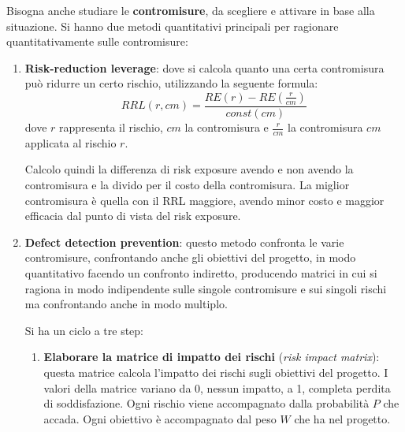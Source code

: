 Bisogna anche studiare le \textbf{contromisure}, da scegliere e attivare in base
alla situazione. Si hanno due metodi quantitativi principali per ragionare
quantitativamente sulle contromisure:
\begin{enumerate}
    \item \textbf{Risk-reduction leverage}: dove si calcola quanto una certa
          contromisura può ridurre un certo rischio, utilizzando la seguente formula:
          \begin{equation}
              RRL(r, cm) = \frac{RE(r) - RE(\frac{r}{cm})}{const(cm)}
          \end{equation}
          dove $r$ rappresenta il rischio, $cm$ la contromisura e $\frac{r}{cm}$ la
          contromisura $cm$ applicata al rischio $r$.

          Calcolo quindi la differenza di risk exposure avendo e non avendo la contromisura
          e la divido per il costo della contromisura. La miglior contromisura è quella
          con il RRL maggiore, avendo minor costo e maggior efficacia dal punto di vista
          del risk exposure.
    \item \textbf{Defect detection prevention}: questo metodo confronta le varie
          contromisure, confrontando anche gli obiettivi del progetto, in modo quantitativo
          facendo un confronto indiretto, producendo matrici in cui si ragiona in modo
          indipendente sulle singole contromisure e sui singoli rischi ma confrontando
          anche in modo multiplo.

          Si ha un ciclo a tre step:
          \begin{enumerate}
              \item \textbf{Elaborare la matrice di impatto dei rischi} (\textit{risk
                        impact matrix}): questa matrice calcola l'impatto dei rischi sugli obiettivi
                    del progetto. I valori della matrice variano da 0, nessun impatto, a 1,
                    completa perdita di soddisfazione. Ogni rischio viene accompagnato dalla
                    probabilità $P$ che accada. Ogni obiettivo è accompagnato dal peso $W$
                    che ha nel progetto.


\end{enumerate}
\end{enumerate}
